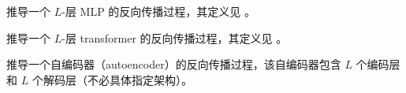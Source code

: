 \documentclass[../../book-main_zh.tex]{subfiles}
\begin{document}
\begin{exercise}
    推导一个 \(L\)-层 MLP 的反向传播过程，其定义见 。
\end{exercise}

\begin{exercise}
    推导一个 \(L\)-层 transformer 的反向传播过程，其定义见 。
\end{exercise}

\begin{exercise}
    推导一个自编码器（autoencoder）的反向传播过程，该自编码器包含 \(L\) 个编码层和 \(L\) 个解码层（不必具体指定架构）。
\end{exercise}
\end{document}

